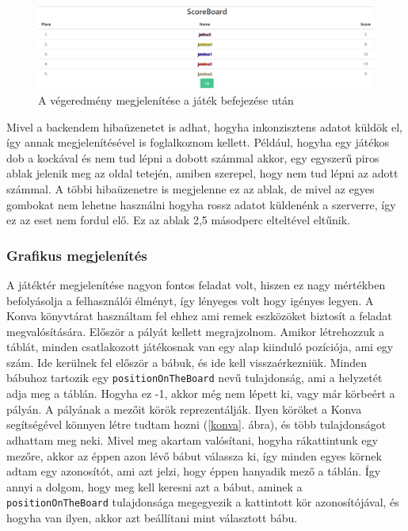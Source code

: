 \documentclass[a4paper,twoside]{article}
\begin{document}
\begin{figure}
	\caption{A végeredmény megjelenítése a játék befejezése után}
	\label{game-end}
	\centering
	\includegraphics[scale=0.32]{game-end}
\end{figure}
\FloatBarrier
Mivel a backendem hibaüzenetet is adhat, hogyha inkonzisztens adatot küldök el, így annak
megjelenítésével is foglalkoznom kellett. Például, hogyha egy játékos dob a kockával és nem tud lépni a dobott számmal akkor, egy egyszerű piros ablak
jelenik meg az oldal tetején, amiben szerepel, hogy nem tud lépni az adott számmal. A többi hibaüzenetre is megjelenne ez az ablak, de mivel az egyes gombokat nem lehetne használni hogyha rossz adatot küldenénk a szerverre, így ez az eset nem fordul elő. Ez az ablak 2,5 másodperc elteltével eltűnik.
\subsubsection{Grafikus megjelenítés}

A játéktér megjelenítése nagyon fontos feladat volt, hiszen ez nagy mértékben befolyásolja a felhasználói élményt, így lényeges volt hogy igényes legyen. A Konva könyvtárat használtam fel ehhez ami remek eszközöket biztosít a feladat megvalósítására. 
Először a pályát kellett megrajzolnom. Amikor létrehozzuk a táblát, minden csatlakozott játékosnak van egy alap kiinduló pozíciója, ami egy szám. Ide kerülnek fel először a bábuk, és ide kell visszaérkezniük. Minden bábuhoz tartozik egy \verb|positionOnTheBoard| nevű tulajdonság, ami a helyzetét adja meg a táblán. Hogyha ez -1, akkor még nem lépett ki, vagy már körbeért a pályán. A pályának a mezőit körök reprezentálják. Ilyen köröket a Konva segítségével könnyen létre tudtam hozni (\ref{konva}. ábra), és több tulajdonságot adhattam meg neki. Mivel meg akartam valósítani, hogyha rákattintunk egy mezőre, akkor az éppen azon lévő bábut válassza ki, így minden egyes körnek adtam egy azonosítót, ami azt jelzi, hogy éppen hanyadik mező a táblán. Így annyi a dolgom, hogy meg kell keresni azt a bábut, aminek a \verb|positionOnTheBoard| tulajdonsága megegyezik a kattintott kör azonosítójával, és hogyha van ilyen, akkor azt beállítani mint választott bábu.
\end{document}
